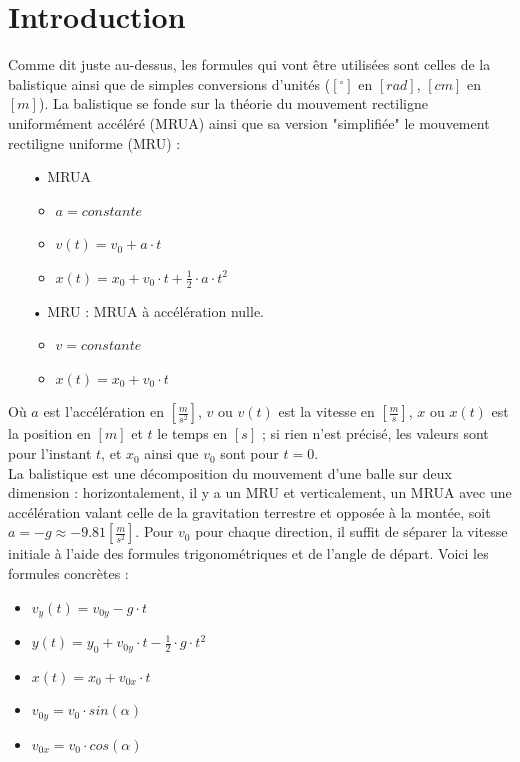 \documentclass[11pt]{article}
\begin{document}
\section{Introduction}
Comme dit juste au-dessus, les formules qui vont être utilisées sont celles de la balistique ainsi que de simples conversions d'unités ($[^{\circ}]$ en $[rad]$, $[cm]$ en $[m]$). La balistique se fonde sur la théorie du mouvement rectiligne uniformément accéléré (MRUA) ainsi que sa version "simplifiée" le mouvement rectiligne uniforme (MRU) :
\begin{itemize}
	\item[•] MRUA
	\begin{itemize}
		\item $a = constante$
		\item $v(t) = v_0 + a \cdot t$
		\item $x(t) = x_0 + v_0 \cdot t + \frac{1}{2} \cdot a \cdot t^2$
	\end{itemize}
	
	\item[•] MRU : MRUA à accélération nulle.
	\begin{itemize}
		\item $v = constante$
		\item $x(t) = x_0 + v_0 \cdot t$
	\end{itemize}
\end{itemize}
Où $a$ est l'accélération en $\left[\frac{m}{s^2}\right]$, $v$ ou $v(t)$ est la vitesse en $\left[\frac{m}{s}\right]$, $x$ ou $x(t)$ est la position en $[m]$ et $t$ le temps en $[s]$ ; si rien n'est précisé, les valeurs sont pour l'instant $t$, et $x_0$ ainsi que $v_0$ sont pour $t=0$.\\
La balistique est une décomposition du mouvement d'une balle sur deux dimension : horizontalement, il y a un MRU et verticalement, un MRUA avec une accélération valant celle de la gravitation terrestre et opposée à la montée, soit $a=-g\approx-9.81\left[\frac{m}{s^2}\right]$. Pour $v_0$ pour chaque direction, il suffit de séparer la vitesse initiale à l'aide des formules trigonométriques et de l'angle de départ. Voici les formules concrètes :
\begin{itemize}
\item $v_y (t) = v_{0y} - g \cdot t$
\item $y(t) = y_0 + v_{0y} \cdot t - \frac{1}{2} \cdot g \cdot t^2$
\item $x(t) = x_0 + v_{0x} \cdot t$
\item $v_{0y} = v_0 \cdot sin(\alpha)$
\item $v_{0x} = v_0 \cdot cos(\alpha)$
\end{itemize} 
\end{document}

